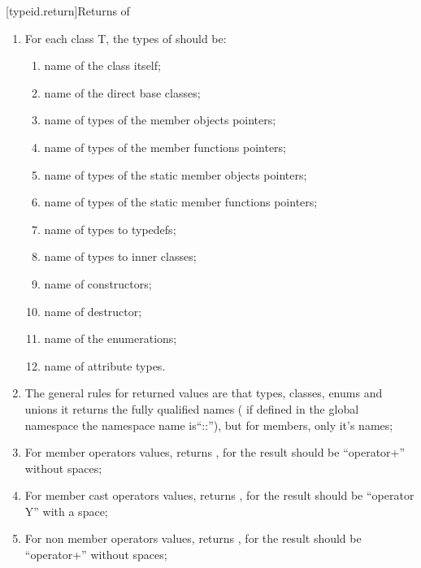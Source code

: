 [typeid.return]{Returns of  }

\begin{enumerate}
\item For each class T, the types of  should be:
\begin{enumerate}
\item name of the class itself; 
\item name of the direct base classes;
\item name of types of the member objects pointers;
\item name of types of the member functions pointers; 
\item name of types of the static member objects pointers;
\item name of types of the static member functions pointers; 
\item name of types to typedefs;
\item name of types to inner classes;
\item name of constructors;
\item name of destructor;
\item name of the enumerations;
\item name of attribute types.
\end{enumerate}

\item The general rules for returned values are that types, classes, enums and unions it returns the fully qualified names ( if defined in the global namespace the namespace name is``::''), but for members, only it's names;
\item For member operators values,  returns , for  the result should be ``operator+'' without spaces; 
\item For member cast operators values,  returns , for  the result should be ``operator Y'' with a space; 
\item For non member operators values,  returns , for  the result should be ``operator+'' without spaces; 
\end{enumerate}

